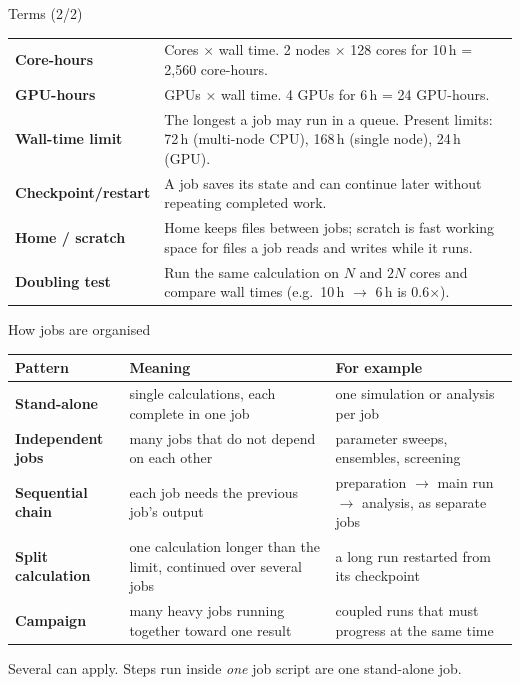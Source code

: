 \documentclass[aspectratio=169,11pt]{beamer}
\newcommand{\term}[1]{\textbf{\textcolor{iiser}{#1}}}
\renewcommand{\arraystretch}{1.25}
\begin{document}
\begin{frame}{Terms (2/2)}
  \footnotesize\renewcommand{\arraystretch}{1.15}
  \begin{tabularx}{\textwidth}{@{}l X@{}}
    \toprule
    \term{Core-hours} & Cores $\times$ wall time. 2 nodes $\times$ 128 cores for 10\,h = 2{,}560 core-hours. \\
    \term{GPU-hours} & GPUs $\times$ wall time. 4 GPUs for 6\,h = 24 GPU-hours. \\
    \term{Wall-time limit} & The longest a job may run in a queue. Present limits: 72\,h (multi-node CPU), 168\,h (single node), 24\,h (GPU). \\
    \term{Checkpoint/restart} & A job saves its state and can continue later without repeating completed work. \\
    \term{Home / scratch} & Home keeps files between jobs; scratch is fast working space for files a job reads and writes while it runs. \\
    \term{Doubling test} & Run the same calculation on $N$ and $2N$ cores and compare wall times (e.g.\ 10\,h $\to$ 6\,h is 0.6$\times$). \\
    \bottomrule
  \end{tabularx}
\end{frame}

\begin{frame}{How jobs are organised}
  \small
  \begin{tabularx}{\textwidth}{@{}l X X@{}}
    \toprule
    \textbf{Pattern} & \textbf{Meaning} & \textbf{For example} \\
    \midrule
    \term{Stand-alone} & single calculations, each complete in one job & one simulation or analysis per job \\
    \term{Independent jobs} & many jobs that do not depend on each other & parameter sweeps, ensembles, screening \\
    \term{Sequential chain} & each job needs the previous job's output & preparation $\to$ main run $\to$ analysis, as separate jobs \\
    \term{Split calculation} & one calculation longer than the limit, continued over several jobs & a long run restarted from its checkpoint \\
    \term{Campaign} & many heavy jobs running together toward one result & coupled runs that must progress at the same time \\
    \bottomrule
  \end{tabularx}
  \vfill
  \normalsize Several can apply. Steps run inside \emph{one} job script are one stand-alone job.
\end{frame}
\end{document}
